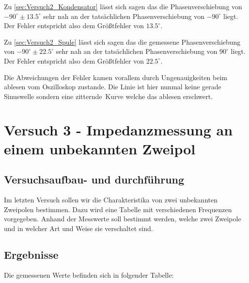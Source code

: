                 \noindent Zu \ref{sec:Versuch2_Kondensator} lässt sich sagen das die Phasenverschiebung von $-90^{\circ} \pm 13.5^{\circ}$ sehr nah an der tatsächlichen Phasenverschiebung von $-90^{\circ}$ liegt. Der Fehler entspricht also dem Größtfehler von $13.5^{\circ}$.

                \noindent Zu \ref{sec:Versuch2_Spule} lässt sich sagen das die gemessene Phasenverschiebung von $-90^{\circ} \pm 22.5^{\circ}$ sehr nah an der tatsächlichen Phasenverschiebung von $90^{\circ}$ liegt. Der Fehler entspricht also dem Größtfehler von $22.5^{\circ}$. 

                \noindent Die Abweichungen der Fehler kamen vorallem durch Ungenauigkeiten beim ablesen vom Oszilloskop zustande. Die Linie ist hier nunmal keine gerade Sinuswelle sondern eine \glqq zitternde\grqq\ Kurve welche das ablesen erschwert. 

\section{Versuch 3 - Impedanzmessung an einem unbekannten Zweipol}
    
    \subsection{Versuchsaufbau- und durchführung}

        Im letzten Versuch sollen wir die Charakteristika von zwei unbekannten Zweipolen bestimmen. Dazu wird eine Tabelle mit verschiedenen Frequenzen vorgegeben. Anhand der Messwerte soll bestimmt werden, welche zwei Zweipole und in welcher Art und Weise sie verschaltet sind.

    \subsection{Ergebnisse}
    
        Die gemessenen Werte befinden sich in folgender Tabelle:

